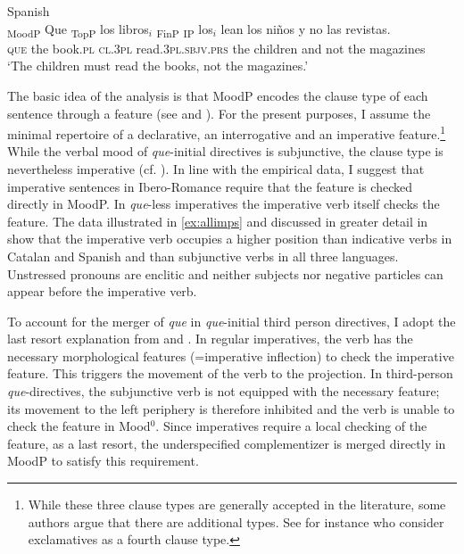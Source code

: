 \ea  \label{ex:clldjuss}
		Spanish\\
\gll {\ob}\textsubscript{MoodP} Que  {\ob}\textsubscript{TopP} los libros$_i$ {\ob}\textsubscript{FinP} {\ob}\textsubscript{IP} los$_i$ lean los  ni\~nos  y no las revistas.{\cb}{\cb}{\cb}{\cb} \\
{} \textsc{que} {} the book.\textsc{pl}  {} {} \textsc{cl.3pl} read.\textsc{3pl.sbjv.prs} the children and not  the magazines\\
\glt`The children must read the books, not the magazines.' 
\z

\begin{sloppypar}
The basic idea of the analysis   is that MoodP encodes the clause type of each sentence through a feature (see \citealt{Lohnstein2015} and \citealt{Kocher2018b}). For the present purposes, I assume the minimal repertoire of a declarative, an interrogative and an imperative feature.\footnote{While these three clause types are generally accepted in the literature, some authors argue that there are additional types. See for instance \citet{Zanuttini2003} who  consider exclamatives as a fourth clause type.} While the  verbal mood of \emph{que}-initial directives  is subjunctive, the clause type  is nevertheless imperative (cf. \citealt{Portner2004}). In line with the empirical data, I suggest that imperative sentences in Ibero-Romance require that the feature is checked directly in MoodP. In \emph{que}-less imperatives the imperative verb itself checks the feature. The data illustrated in \eqref{ex:allimps} and discussed in greater detail in   show that the imperative verb occupies a higher position than  indicative verbs in Catalan and Spanish  and than subjunctive verbs in all three languages. Unstressed pronouns are enclitic and neither subjects nor negative particles can appear before the imperative verb. 
\end{sloppypar}

To account for the merger of \emph{que} in \emph{que}-initial third person directives, I adopt  the last resort explanation from \citet{Rivero1995} and \citet{DemonteSoriano2014}.  In regular imperatives, the verb has the necessary morphological features (=imperative inflection) to check the imperative feature. This  triggers the movement of the verb to the projection. In  third-person \emph{que}-directives, the subjunctive verb is not equipped with the necessary feature; its movement to the left periphery is therefore inhibited  and the verb is unable to check the feature in Mood$^0$. Since imperatives require a local checking of the feature, as a last resort, the underspecified complementizer is merged directly in MoodP to satisfy this requirement. 

